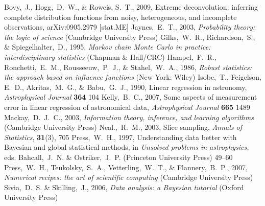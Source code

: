 \documentclass[12pt,twoside,pdftex]{article}
\begin{document}
\clearpage
\begin{thebibliography}{}
  Bovy,~J., Hogg,~D.~W., \& Roweis, S.~T., 2009,
  Extreme deconvolution: inferring complete distribution functions from noisy, heterogeneous, and incomplete observations, 
  arXiv:0905.2979 [stat.ME]
  Jaynes,~E.~T., 2003,
  \textit{Probability theory: the logic of science} (Cambridge University Press)
  Gilks,~W.~R., Richardson,~S., \& Spiegelhalter,~D., 1995,
  \textit{Markov chain Monte Carlo in practice: interdisciplinary statistics} (Chapman \& Hall/CRC)
  Hampel,~F.~R., Ronchetti,~E.~M., Rousseeuw,~P.~J., \& Stahel,~W.~A., 1986, 
  \textit{Robust statistics: the approach based on influence functions} (New York: Wiley)
  Isobe,~T., Feigelson, E.~D., Akritas,~M.~G., \& Babu,~G.~J., 1990,
  Linear regression in astronomy,
  \textit{Astrophysical Journal} \textbf{364} 104
  Kelly,~B.~C., 2007,
  Some aspects of measurement error in linear regression of astronomical data,
  \textit{Astrophysical Journal} \textbf{665} 1489
  Mackay,~D.~J.~C., 2003,
  \textit{Information theory, inference, and learning algorithms} (Cambridge University Press)
  Neal.,~R.~M., 2003,
  Slice sampling,
  \textit{Annals of Statistics}, \textbf{31}(3), 705
  Press,~W.~H., 1997,
  Understanding data better with Bayesian and global statistical methods,
  in \textit{Unsolved problems in astrophysics,}
  eds. Bahcall,~J.~N. \& Ostriker,~J.~P. (Princeton University Press)
  49--60
  Press,~W.~H., Teukolsky,~S.~A., Vetterling,~W.~T., \& Flannery,~B.~P., 2007,
  \textit{Numerical recipes: the art of scientific computing} (Cambridge University Press)
  Sivia,~D.~S. \& Skilling,~J., 2006,
  \textit{Data analysis: a Bayesian tutorial} (Oxford University Press)
\end{thebibliography}
\end{document}
